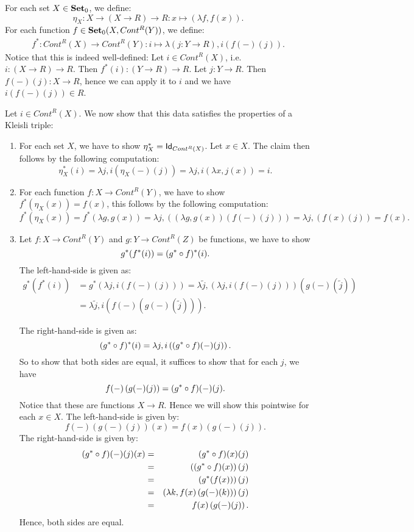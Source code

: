 \begin{solution}
\label{sol:kleisli_triple_continuation}
For each set $X\in\Ob \SET$, we define:
\[
\eta_X : X \to (X\to R)\to R : x\mapsto (\lambda f, f(x)).
\]
For each function $f\in\CHom{\Ob \SET}{X}{Cont^R(Y)}$, we define:
\begin{align*}
f^{*} : Cont^R(X) \to Cont^R(Y) : i \mapsto \lambda (j:Y\to R), i(f(-)(j)).
\end{align*}
Notice that this is indeed well-defined: Let $i\in Cont^R(X)$, i.e. $i:(X\to R)\to R$. Then $f^{*}(i) : (Y\to R)\to R$. Let $j:Y\to R$. Then $f(-)(j) : X\to R$, hence we can apply it to $i$ and we have $i\left(f(-)(j)\right)\in R$.

Let $i\in Cont^R(X)$. We now show that this data satisfies the properties of a Kleisli triple:
\begin{enumerate}
\item For each set $X$, we have to show $\eta_X^{*} = \Id[Cont^R(X)]$. Let $x\in X$. The claim then follows by the following computation:
\[
\eta_X^{*}(i) = \lambda j, i\left(\eta_X(-)(j)\right) = \lambda j, i\left(\lambda x, j(x)\right) = i.
\]

\item For each function $f:X\to Cont^R(Y)$, we have to show $f^{*}(\eta_X(x)) = f(x)$, this follows by the following computation:
\[
f^{*}(\eta_X(x)) = f^{*}(\lambda g,g(x)) = \lambda j, \left(\left(\lambda g,g(x)\right)(f(-)(j))\right) = \lambda j, (f(x)(j)) = f(x).
\]

\item Let $f:X\to Cont^R(Y)$ and $g:Y\to Cont^R(Z)$ be functions, we have to show 
\[
g^{*}(f^{*}(i)) = (\co{f}{g^{*}})^{*}(i).
\] 
The left-hand-side is given as:
\begin{align*}
	g^{*}(f^{*}(i)) & = g^{*}\left(\lambda j, i\left(f(-)(j)\right)\right) = \lambda \tilde{j}, \left(\lambda j, i\left(f(-)(j)\right)\right)\left(g(-)(\tilde{j})\right) \\
	& = \lambda \tilde{j}, i\left(f(-)\left(g(-)(\tilde{j})\right)\right).
\end{align*}

The right-hand-side is given as:
\[
(\co{f}{g^{*}})^{*}(i) = \lambda j, i\left((\co{f}{g^{*}})(-)(j)\right).
\]
So to show that both sides are equal, it suffices to show that for each $j$, we have 
\[
f(-)\left(g(-)(j)\right) = (\co{f}{g^{*}})(-)(j).
\]
Notice that these are functions $X\to R$. Hence we will show this pointwise for each $x\in X$. The left-hand-side is given by: 
\[
f(-)\left(g(-)(j)\right)(x) = f(x)\left(g(-)(j)\right).
\]
The right-hand-side is given by:
\begin{eqnarray*}
(\co{f}{g^{*}})(-)(j)(x) &=& (\co{f}{g^{*}})(x)(j)\\ 
	&=& \left( (\co{f}{g^{*}})(x) \right)(j)\\ 
	&=& \left(g^{*}(f(x))\right)(j)\\ 
	&=& \left( \lambda k, f(x)\left(g(-)(k)\right) \right)(j)\\ 
	&=& f(x)\left(g(-)(j)\right).
\end{eqnarray*}
Hence, both sides are equal.


\end{enumerate}
\end{solution}
